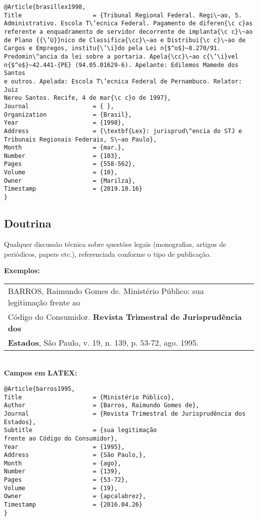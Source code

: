 \begin{verbatim}
@Article{brasillex1998,
Title                    = {Tribunal Regional Federal. Regi\~ao, 5. 
Administrativo. Escola T\’ecnica Federal. Pagamento de diferen{\c c}as 
referente a enquadramento de servidor decorrente de implanta{\c c}\~ao 
de Plano {{\’U}}nico de Classifica{\cc}\~ao e Distribui{\c c}\~ao de 
Cargos e Empregos, institu{\’\i}do pela Lei n{$^o$}~8.270/91. 
Predomin\^ancia da lei sobre a portaria. Apela{\cc}\~ao c{\’\i}vel
n{$^o$}~42.441-{PE} (94.05.01629-6). Apelante: Edilemos Mamede dos Santos
e outros. Apelada: Escola T\’ecnica Federal de Pernambuco. Relator: Juiz
Nereu Santos. Recife, 4 de mar{\c c}o de 1997},
Journal                  = { },
Organization             = {Brasil},
Year                     = {1998},
Address                  = {\textbf{Lex}: jurisprud\^encia do STJ e 
Tribunais Regionais Federais, S\~ao Paulo},
Month                    = {mar.},
Number                   = {103},
Pages                    = {558-562},
Volume                   = {10},
Owner                    = {Marilza},
Timestamp                = {2019.10.16}
}
\end{verbatim}

\subsection{Doutrina}

Qualquer discussão técnica sobre questões legais (monografias, artigos
de periódicos, papers etc.), referenciada conforme o tipo de publicação. 

\textbf{Exemplos:} \\

\begin{tabular}{|l|c|} \hline
	BARROS, Raimundo Gomes de. Ministério Público: sua legitimação	frente ao\\
	Código do Consumidor. \textbf{Revista Trimestral de Jurisprudência dos}\\
	\textbf{Estados}, São Paulo, v. 19, n. 139, p. 53-72, ago. 1995. \\\hline
\end{tabular} \\

\textbf{Campos em LATEX:} 

\begin{verbatim}
@Article{barros1995,
Title                    = {Ministério Público},
Author                   = {Barros, Raimundo Gomes de},
Journal                  = {Revista Trimestral de Jurisprudência dos 
Estados},
Subtitle                 = {sua legitimação
frente ao Código do Consumidor},
Year                     = {1995},
Address                  = {São Paulo,},
Month                    = {ago},
Number                   = {139},
Pages                    = {53-72},
Volume                   = {19},
Owner                    = {apcalabrez},
Timestamp                = {2016.04.26}
}
\end{verbatim}

